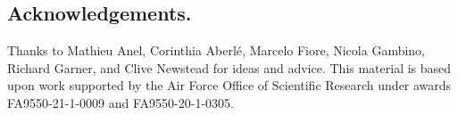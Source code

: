 \documentclass[12pt,reqno]{amsart}
\theoremstyle{remark}
\theoremstyle{definition}
\begin{document}
\subsection*{Acknowledgements.}

\quad Thanks to Mathieu Anel, Corinthia Aberl\'e, Marcelo
Fiore, Nicola Gambino, Richard Garner, and Clive Newstead for ideas and advice.  This material is based upon work supported by the Air Force Office of Scientific Research under awards FA9550-21-1-0009 and FA9550-20-1-0305.




\end{document}
